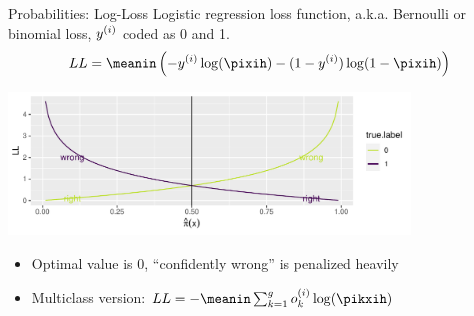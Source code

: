 \documentclass[11pt,compress,t,notes=noshow, xcolor=table]{beamer}
\newenvironment{knitrout}{}{} %
\begin{document}
\begin{vbframe}{Probabilities: Log-Loss}
Logistic regression loss function, a.k.a. Bernoulli or binomial loss, $y^{(i)}$ coded as 0 and 1.
\[
LL = \meanin \left( - \yi \log(\pixih) - (1-\yi) \log(1-\pixih) \right)
\]
\begin{knitrout}\scriptsize
{}\color{fgcolor}

{\centering \includegraphics[width=0.8\textwidth]{figure/eval_mclass_2}  

}



\end{knitrout}
\begin{itemize}
  \item Optimal value is 0, \enquote{confidently wrong} is penalized heavily
  \item Multiclass version: $ LL = - \meanin \sumkg o_k^{(i)} \log(\pikxih) $
\end{itemize}
\end{vbframe}


\endlecture
\end{document}
